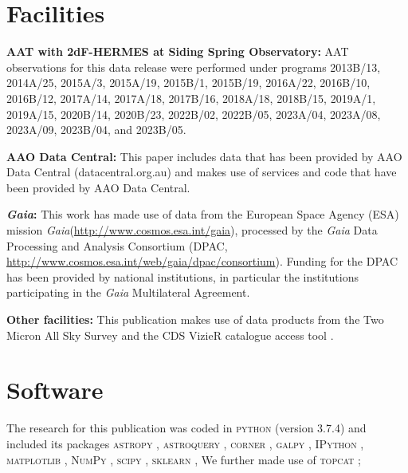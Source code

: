\documentclass[
  journal=pasa,
  manuscript=research-paper, %
  year=2024,
  volume=37
]{cup-journal}
\newcommand{\Gaia}{\textit{Gaia}\xspace}
\begin{document}
\section*{Facilities}

\textbf{AAT with 2dF-HERMES at Siding Spring Observatory:}
AAT observations for this data release were performed under programs {2013B/13}, {2014A/25}, {2015A/3}, {2015A/19}, {2015B/1}, {2015B/19}, {2016A/22}, {2016B/10}, {2016B/12}, {2017A/14}, {2017A/18}, {2017B/16}, {2018A/18}, {2018B/15}, {2019A/1}, {2019A/15}, {2020B/14}, {2020B/23}, {2022B/02}, {2022B/05}, {2023A/04}, {2023A/08}, {2023A/09}, {2023B/04}, and {2023B/05}.

\textbf{AAO Data Central:} This paper includes data that has been provided by AAO Data Central  (datacentral.org.au) and makes use of services and code that have been provided by AAO Data Central.

\textbf{\Gaia: } This work has made use of data from the European Space Agency (ESA) mission \Gaia (\url{http://www.cosmos.esa.int/gaia}), processed by the \Gaia Data Processing and Analysis Consortium (DPAC, \url{http://www.cosmos.esa.int/web/gaia/dpac/consortium}). Funding for the DPAC has been provided by national institutions, in particular the institutions participating in the \Gaia Multilateral Agreement. 

\textbf{Other facilities:} This publication makes use of data products from the Two Micron All Sky Survey \citep{Skrutskie2006} and the CDS VizieR catalogue access tool \citep{Vizier2000}.

\section*{Software}

The research for this publication was coded in \textsc{python} (version 3.7.4) and included its packages
\textsc{astropy} \citep[v. 3.2.2;][]{Robitaille2013,PriceWhelan2018},
\textsc{astroquery} \citep[v. 0.4;][]{Ginsburg2019},
\textsc{corner} \citep[v. 2.0.1;][]{corner},
\textsc{galpy} \citep[version 1.6.0;][]{Bovy2015},
\textsc{IPython} \citep[v. 7.8.0;][]{ipython},
\textsc{matplotlib} \citep[v. 3.1.3;][]{matplotlib},
\textsc{NumPy} \citep[v. 1.17.2;][]{numpy},
\textsc{scipy} \citep[version 1.3.1;][]{scipy},
\textsc{sklearn} \citep[v. 0.21.3;][]{scikit-learn},
We further made use of \textsc{topcat} \citep[version 4.7;][]{Taylor2005};




\appendix
\end{document}
